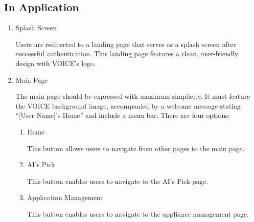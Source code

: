\documentclass[conference]{IEEEtran}
\begin{document}
\vspace{0.7em} %

\subsection{In Application}
\vspace{0.5em}

\begin{enumerate}[label=\arabic*]
    \item Splash Screen\par
    \vspace{0.3em}
    Users are redirected to a landing page that serves as a splash screen after successful authentication. This landing page features a clean, user-friendly design with VOICE's logo. 
    
    \vspace{1em}
    
    \item Main Page\par
    \vspace{0.3em}
    The main page should be expressed with maximum simplicity. It must feature the VOICE background image, accompanied by a welcome message stating “[User Name]’s Home” and include a menu bar. There are four options:
    \vspace{0.3em}

    \begin{enumerate}[label=\arabic*)]
        \item Home\par
        \vspace{0.3em}
        This button allows users to navigate from other pages to the main page.

        \vspace{0.5em}

        \item AI's Pick\par
        \vspace{0.3em}
        This button enables users to navigate to the AI’s Pick page.

        \vspace{0.5em}

        \item Application Management\par
        \vspace{0.3em}
        This button enables users to navigate to the appliance management page.


\end{enumerate}
\end{enumerate}
\end{document}
